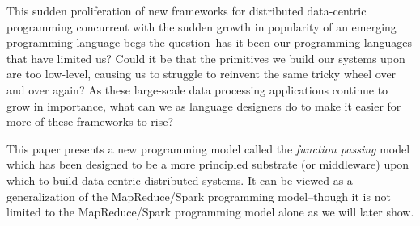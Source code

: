 \documentclass[preprint]{sigplanconf}
\theoremstyle{definition}
\theoremstyle{definition}
\begin{document}

This sudden proliferation of new frameworks for distributed data-centric
programming concurrent with the sudden growth in popularity of an emerging
programming language begs the question--has it been our programming languages
that have limited us? Could it be that the primitives we build our systems upon
are too low-level, causing us to struggle to reinvent the same tricky wheel over
and over again? As these large-scale data processing applications continue to
grow in importance, what can we as language designers  do to make
it easier for more of these frameworks to rise?

This paper presents a new programming model called the {\em function passing}
model which has been designed to be a more principled substrate (or
middleware) upon which to build data-centric distributed systems. It
can be viewed as a generalization of the MapReduce/Spark programming
model--though it is not limited to the MapReduce/Spark programming model alone
as we will later show.
\end{document}
